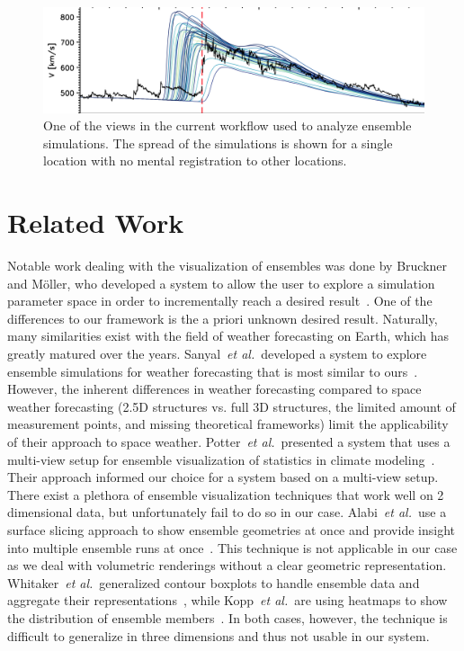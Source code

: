\documentclass[journal]{vgtc}                %
\def\etal{\textit{et al.}}
\begin{document}
\begin{figure}
\newcommand{\abImageWidth}{\columnwidth}
\centering
\includegraphics[width=\abImageWidth]{figures/current_workflow_ensemble.png}
\caption{One of the views in the current workflow used to analyze ensemble simulations. The spread of the simulations is shown for a single location with no mental registration to other locations.}
\label{fig:currentworkflow:ensemble}
\end{figure}

\section{Related Work}
 Notable work dealing with the visualization of ensembles was done by Bruckner and M\"oller, who developed a system to allow the user to explore a simulation parameter space in order to incrementally reach a desired result~\cite{bruckner2010result}. One of the differences to our framework is the a priori unknown desired result. Naturally, many similarities exist with the field of weather forecasting on Earth, which has greatly matured over the years. Sanyal~\etal\ developed a system to explore ensemble simulations for weather forecasting that is most similar to ours~\cite{sanyal2010noodles}. However, the inherent differences in weather forecasting compared to space weather forecasting (2.5D structures vs. full 3D structures, the limited amount of measurement points, and missing theoretical frameworks) limit the applicability of their approach to space weather. Potter~\etal\ presented a system that uses a multi-view setup for ensemble visualization of statistics in climate modeling~\cite{potter2009ensemble}. Their approach informed our choice for a system based on a multi-view setup. There exist a plethora of ensemble visualization techniques that work well on 2 dimensional data, but unfortunately fail to do so in our case. Alabi~\etal\ use a surface slicing approach to show ensemble geometries at once and provide insight into multiple ensemble runs at once~\cite{alabi2012comparative}. This technique is not applicable in our case as we deal with volumetric renderings without a clear geometric representation. Whitaker~\etal\ generalized contour boxplots to handle ensemble data and aggregate their representations~\cite{whitaker2013contour}, while Kopp~\etal\ are using heatmaps to show the distribution of ensemble members~\cite{kopp2014decision}. In both cases, however, the technique is difficult to generalize in three dimensions and thus not usable in our system.
\end{document}
